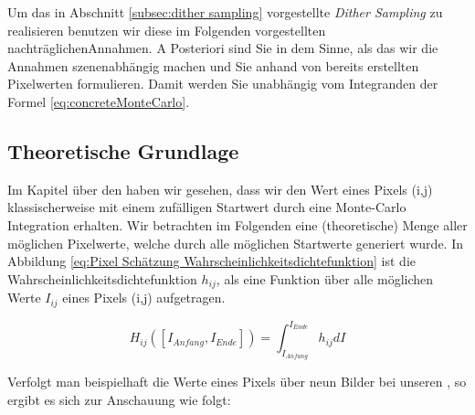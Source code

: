 Um das in Abschnitt \ref{subsec:dither sampling} vorgestellte \textit{Dither Sampling} zu realisieren
benutzen wir diese im Folgenden vorgestellten \glqq nachträglichen\grqq Annahmen. 
A Posteriori sind Sie in dem Sinne, als das wir die Annahmen szenenabhängig machen und Sie anhand 
von bereits erstellten Pixelwerten formulieren. Damit werden Sie unabhängig vom Integranden der Formel 
\ref{eq:concreteMonteCarlo}.

\subsection{Theoretische Grundlage}

Im Kapitel über den  haben wir gesehen, dass 
wir den Wert eines Pixels (i,j) klassischerweise mit einem zufälligen
Startwert durch eine Monte-Carlo Integration erhalten. Wir betrachten im
Folgenden eine (theoretische) Menge aller möglichen Pixelwerte, welche durch alle möglichen Startwerte generiert wurde.
In Abbildung \ref{eq:Pixel Schätzung Wahrscheinlichkeitsdichtefunktion} ist die Wahrscheinlichkeitsdichtefunktion
$h_{ij}$, als eine Funktion über alle möglichen Werte $I_{ij}$ eines Pixels (i,j) aufgetragen.

\begin{equation}\label{eq:Pixel Schätzung Wahrscheinlichkeitsdichtefunktion}
    H_{ij}([I_{Anfang},I_{Ende}]) = \int_{I_{Anfang}}^{I_{Ende}} h_{ij} dI
\end{equation}

Verfolgt man beispielhaft die Werte eines Pixels über neun Bilder bei unseren , 
so ergibt es sich zur Anschauung wie folgt:

